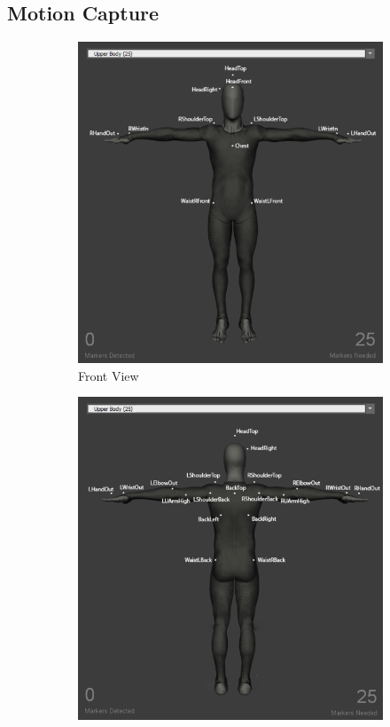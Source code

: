\subsection{Motion Capture}
\begin{figure}[h]
    \centering
    \begin{subfigure}[b]{0.45\columnwidth}
        \includegraphics[width=\textwidth]{images/skleton.png}
        \caption{Front View }
        \label{fig:phone1}
    \end{subfigure}
    \begin{subfigure}[b]{0.45\columnwidth}
        \includegraphics[width=\textwidth]{images/skeleton2.png}

\end{subfigure}
\end{figure}

